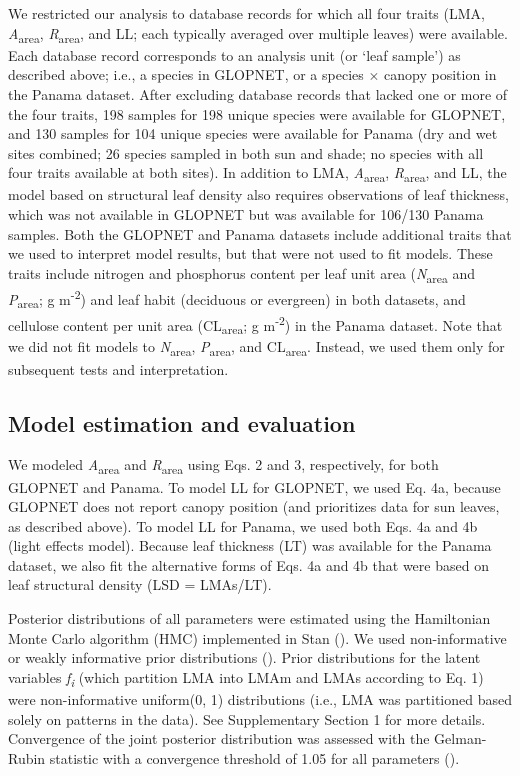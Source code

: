 \documentclass[
  12pt,
  letterpaper,
  DIV=11,
  numbers=noendperiod]{scrartcl}
\begin{document}
We restricted our analysis to database records for which all four traits
(LMA, \emph{A}\textsubscript{area}, \emph{R}\textsubscript{area}, and
LL; each typically averaged over multiple leaves) were available. Each
database record corresponds to an analysis unit (or `leaf sample') as
described above; i.e., a species in GLOPNET, or a species \(\times\)
canopy position in the Panama dataset. After excluding database records
that lacked one or more of the four traits, 198 samples for 198 unique
species were available for GLOPNET, and 130 samples for 104 unique
species were available for Panama (dry and wet sites combined; 26
species sampled in both sun and shade; no species with all four traits
available at both sites). In addition to LMA,
\emph{A}\textsubscript{area}, \emph{R}\textsubscript{area}, and LL, the
model based on structural leaf density also requires observations of
leaf thickness, which was not available in GLOPNET but was available for
106/130 Panama samples. Both the GLOPNET and Panama datasets include
additional traits that we used to interpret model results, but that were
not used to fit models. These traits include nitrogen and phosphorus
content per leaf unit area (\emph{N}\textsubscript{area} and
\emph{P}\textsubscript{area}; g m\textsuperscript{-2}) and leaf habit
(deciduous or evergreen) in both datasets, and cellulose content per
unit area (CL\textsubscript{area}; g m\textsuperscript{-2}) in the
Panama dataset. Note that we did not fit models to
\emph{N}\textsubscript{area}, \emph{P}\textsubscript{area}, and
CL\textsubscript{area}. Instead, we used them only for subsequent tests
and interpretation.

\subsection{Model estimation and
evaluation}\label{model-estimation-and-evaluation}

We modeled \emph{A}\textsubscript{area} and \emph{R}\textsubscript{area}
using Eqs. 2 and 3, respectively, for both GLOPNET and Panama. To model
LL for GLOPNET, we used Eq. 4a, because GLOPNET does not report canopy
position (and prioritizes data for sun leaves, as described above). To
model LL for Panama, we used both Eqs. 4a and 4b (light effects model).
Because leaf thickness (LT) was available for the Panama dataset, we
also fit the alternative forms of Eqs. 4a and 4b that were based on leaf
structural density (LSD = LMAs/LT).

Posterior distributions of all parameters were estimated using the
Hamiltonian Monte Carlo algorithm (HMC) implemented in Stan
(). We used
non-informative or weakly informative prior distributions
(). Prior distributions for the
latent variables \emph{f\textsubscript{i}} (which partition LMA into
LMAm and LMAs according to Eq. 1) were non-informative uniform(0, 1)
distributions (i.e., LMA was partitioned based solely on patterns in the
data). See Supplementary Section 1 for more details. Convergence of the
joint posterior distribution was assessed with the Gelman-Rubin
statistic with a convergence threshold of 1.05 for all parameters
().
\end{document}
